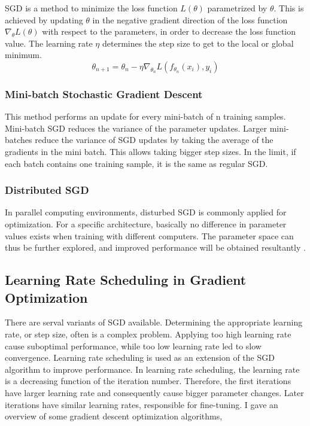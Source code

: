     SGD is a method to minimize the loss function \(L(\theta)\)  parametrized by $\theta$. This is achieved by updating $\theta$ in the negative gradient direction of the loss function $\nabla_{\theta}L(\theta)$ with respect to the parameters, in order to decrease the loss function value. The learning rate $\eta$ determines the step size to get to the local or global minimum. 
    \begin{equation}
        \theta_{n+1} = \theta_{n} - \eta \nabla_{\theta_{n}}L(f_{\theta_{n}}(x_i), y_i)
    \end{equation}

    \subsubsection{Mini-batch Stochastic Gradient Descent}
    This method performs an update for every mini-batch of n training samples. Mini-batch SGD reduces the variance of the parameter updates. Larger mini-batches reduce the variance of SGD updates by taking the average of the gradients in the mini batch. This allows taking bigger step sizes. In the limit, if each batch contains one training sample, it is the same as regular SGD.

    \subsubsection{Distributed SGD}
    In parallel computing environments, disturbed SGD is commonly applied for optimization. For a specific architecture, basically no difference in parameter values exists when training with different computers. The parameter space can thus be further explored, and improved performance will be obtained resultantly \cite{zhang2015deep}.

    \subsection{Learning Rate Scheduling in Gradient Optimization}
    \label{learning}
    There are serval variants of SGD available. Determining the appropriate learning rate, or step size, often is a complex problem. Applying too high learning rate cause suboptimal performance, while too low learning rate led to slow convergence. Learning rate scheduling is used as an extension of the SGD algorithm to improve performance. In learning rate scheduling, the learning rate is a decreasing function of the iteration number. Therefore, the first iterations have larger learning rate and consequently cause bigger parameter changes. Later iterations have similar learning rates, responsible for fine-tuning. I gave an overview of some gradient descent optimization algorithms,

